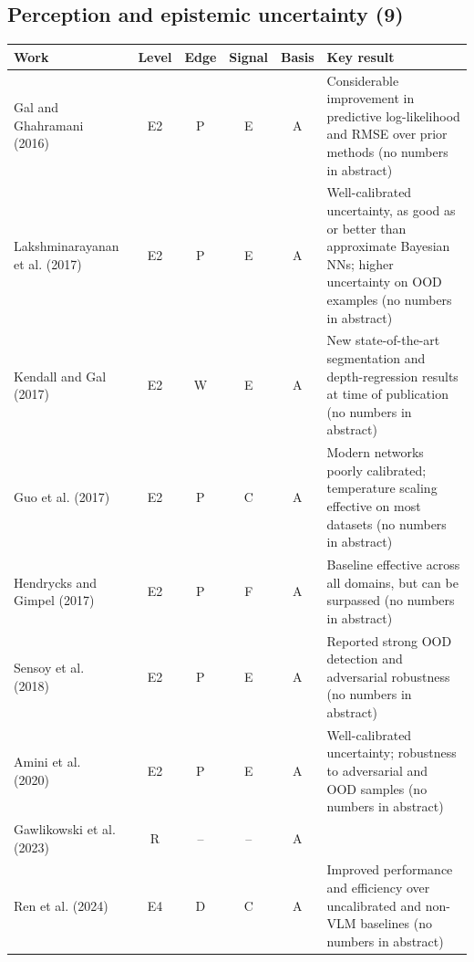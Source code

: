 \documentclass[10pt,a4paper]{article}
\begin{document}
\subsection*{Perception and epistemic uncertainty (9)}
\begin{longtable}{@{}>{\raggedright\arraybackslash}p{4.0cm}cccc>{\raggedright\arraybackslash}p{7.6cm}@{}}
\toprule \textbf{Work} & \textbf{Level} & \textbf{Edge} & \textbf{Signal} & \textbf{Basis} & \textbf{Key result} \\ \midrule \endhead
Gal and Ghahramani (2016)~\cite{Gal2016} & E2 & P & E & A & Considerable improvement in predictive log-likelihood and RMSE over prior methods (no numbers in abstract) \\
Lakshminarayanan et al. (2017)~\cite{Lakshminarayanan2017} & E2 & P & E & A & Well-calibrated uncertainty, as good as or better than approximate Bayesian NNs; higher uncertainty on OOD examples (no numbers in abstract) \\
Kendall and Gal (2017)~\cite{Kendall2017} & E2 & W & E & A & New state-of-the-art segmentation and depth-regression results at time of publication (no numbers in abstract) \\
Guo et al. (2017)~\cite{Guo2017} & E2 & P & C & A & Modern networks poorly calibrated; temperature scaling effective on most datasets (no numbers in abstract) \\
Hendrycks and Gimpel (2017)~\cite{Hendrycks2017} & E2 & P & F & A & Baseline effective across all domains, but can be surpassed (no numbers in abstract) \\
Sensoy et al. (2018)~\cite{Sensoy2018} & E2 & P & E & A & Reported strong OOD detection and adversarial robustness (no numbers in abstract) \\
Amini et al. (2020)~\cite{Amini2020} & E2 & P & E & A & Well-calibrated uncertainty; robustness to adversarial and OOD samples (no numbers in abstract) \\
Gawlikowski et al. (2023)~\cite{Gawlikowski2023} & R & -- & -- & A &  \\
Ren et al. (2024)~\cite{Ren2024} & E4 & D & C & A & Improved performance and efficiency over uncalibrated and non-VLM baselines (no numbers in abstract) \\
\bottomrule\end{longtable}
\end{document}
